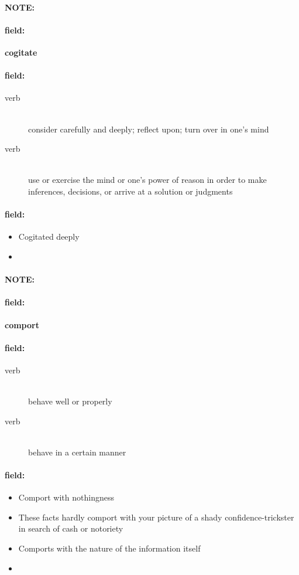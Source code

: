 \documentclass[12pt]{article}
\newenvironment{note}{\paragraph{NOTE:}}{}
\newenvironment{field}{\paragraph{field:}}{}
\begin{document}
\begin{note}
\begin{field}
\textbf{\large cogitate}
\end{field}


\begin{field}
\begin{description}
\item[verb] \hfill \\ 
consider carefully and deeply; reflect upon; turn over in one's mind

\item[verb] \hfill \\ 
use or exercise the mind or one's power of reason in order to make inferences, decisions, or arrive at a solution or judgments

\end{description}
\end{field}

\begin{field}
\begin{itemize}
\item Cogitated deeply
\item 
\end{itemize}
\end{field}
\end{note}
\begin{note}
\begin{field}
\textbf{\large comport}
\end{field}


\begin{field}
\begin{description}
\item[verb] \hfill \\ 
behave well or properly

\item[verb] \hfill \\ 
behave in a certain manner

\end{description}
\end{field}

\begin{field}
\begin{itemize}
\item Comport with nothingness
\item These facts hardly comport with your picture of a shady confidence-trickster in search of cash or notoriety
\item Comports with the nature of the information itself
\item 
\end{itemize}
\end{field}
\end{note}
\end{document}
